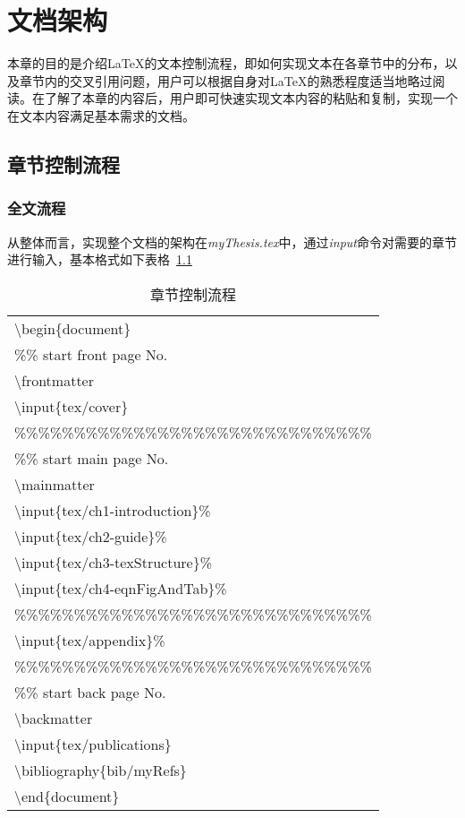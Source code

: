 
\chapter{文档架构}
\label{chap:textStructure}

本章的目的是介绍\LaTeX{}的文本控制流程，即如何实现文本在各章节中的分布，以及章节内的交叉引用问题，用户可以根据自身对\LaTeX{}的熟悉程度适当地略过阅读。在了解了本章的内容后，用户即可快速实现文本内容的粘贴和复制，实现一个在文本内容满足基本需求的文档。

\section{章节控制流程}
\label{sec:controlFlow}
\subsection{全文流程}
从整体而言，实现整个文档的架构在{\it{myThesis.tex}}中，通过{\it{input}}命令对需要的章节进行输入，基本格式如下表格~\ref{tab:controlFlow}

\begin{table}[htb]
 \centering
  \caption{章节控制流程}        %
  \label{tab:controlFlow}    %
   \begin{tabular}{l}
   \hline
   \textbackslash begin\{document\}                \\
   \%\% start front page No.                       \\
   \textbackslash frontmatter                      \\
   \textbackslash input\{tex/cover\}                 \\
   \%\%\%\%\%\%\%\%\%\%\%\%\%\%\%\%\%\%\%\%\%\%\%\%\%\%\%\%\%\% \\
   \%\% start main page No.                        \\
   \textbackslash mainmatter                       \\
   \textbackslash input\{tex/ch1-introduction\}\%    \\
   \textbackslash input\{tex/ch2-guide\}\%           \\
   \textbackslash input\{tex/ch3-texStructure\}\%    \\
   \textbackslash input\{tex/ch4-eqnFigAndTab\}\%    \\
   \%\%\%\%\%\%\%\%\%\%\%\%\%\%\%\%\%\%\%\%\%\%\%\%\%\%\%\%\%\% \\
   \textbackslash input\{tex/appendix\}\%            \\
   \%\%\%\%\%\%\%\%\%\%\%\%\%\%\%\%\%\%\%\%\%\%\%\%\%\%\%\%\%\% \\
   \%\% start back page No.                        \\
   \textbackslash backmatter                       \\
   \textbackslash input\{tex/publications\}          \\
   \textbackslash bibliography\{bib/myRefs\}         \\
   \textbackslash end\{document\}                    \\
   \hline
  \end{tabular}
\end{table}


